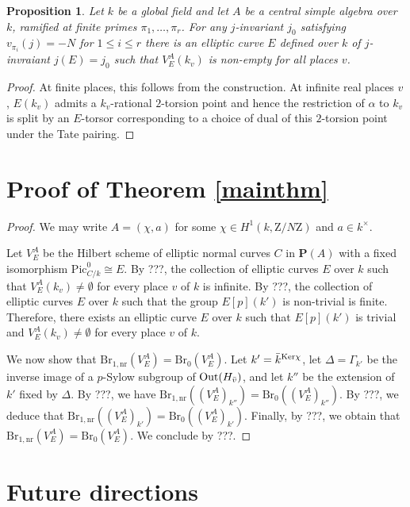 \documentclass[10pt,letterpaper,twoside]{article}
\newcommand{\Z}{\mathrm{Z}}
\renewcommand{\1}{\mathbf{1}}
\newcommand{\bP}{\mathbf{P}}
\newcommand{\nr}{\mathrm{nr}}
\renewcommand{\leq}{\leqslant}
\newcommand{\Pic}{\mathrm{Pic}}
\newcommand{\Br}{\mathrm{Br}}
\newcommand{\iso}{\cong}
\theoremstyle{plain}
\newtheorem{proposition}[theorem]{Proposition}
\theoremstyle{plain}
\theoremstyle{definition}
\theoremstyle{named}
\theoremstyle{definition}
\begin{document}
	\begin{proposition}
		Let $k$ be a global field and let $A$ be a central simple algebra over $k$, ramified at finite
		primes $\pi_1,\ldots,\pi_r$. For any $j$-invariant $j_0$ satisfying
		$v_{\pi_i}(j)=-N$ for $1\leq i\leq r$ there is an elliptic curve $E$ defined over $k$ of
		$j$-invraiant $j(E)=j_0$ such that $V_E^A(k_v)$ is non-empty for all places $v$.
	\end{proposition}
	
	\begin{proof}
		At finite places, this follows from the construction. At infinite real places $v$, $E(k_v)$ admits a
		$k_v$-rational $2$-torsion point and hence the restriction of $\alpha$ to $k_v$ is split by an
		$E$-torsor corresponding to a choice of dual of this $2$-torsion point under the Tate pairing.
	\end{proof}
	
	
	
	\section{Proof of Theorem \ref{mainthm}}
	
	\begin{proof}
		We may write $A=(\chi,a)$ for some $\chi\in H^1(k,\Z/N\Z)$ and $a\in k^\times$. 
		
		Let $V_E^A$ be the Hilbert scheme of elliptic normal curves $C$ in $\bP(A)$ with a fixed isomorphism $\Pic_{C/k}^0\iso E$. By ???, the collection of elliptic curves $E$ over $k$ such that $V_E^A(k_v)\neq \emptyset$ for every place $v$ of $k$ is infinite. By ???, the collection of elliptic curves $E$ over $k$ such that the group $E[p](k')$ is non-trivial is finite. Therefore, there exists an elliptic curve $E$ over $k$ such that $E[p](k')$ is trivial and $V_E^A(k_v)\neq \emptyset$ for every place $v$ of $k$.
		
		We now show that $\Br_{1,\nr}(V_E^A)=\Br_0(V_E^A)$. Let $k'=\Bar{k}^{\mathrm{Ker}\chi}$, let $\Delta= \Gamma_{k'}$ be the inverse image of a $p$-Sylow subgroup of $\mathrm{Out}(H_{\Bar{v}})$, and let $k''$ be the extension of $k'$ fixed by $\Delta$. By ???, we have $\Br_{1,\nr}((V_E^A)_{k''})=\Br_0((V_E^A)_{k''})$. By ???, we deduce that $\Br_{1,\nr}((V_E^A)_{k'})=\Br_0((V_E^A)_{k'})$. Finally, by ???, we obtain that $\Br_{1,\nr}(V_E^A)=\Br_0(V_E^A)$. We conclude by ???.
	\end{proof}
	
	
	\section{Future directions}
	
\end{document}

